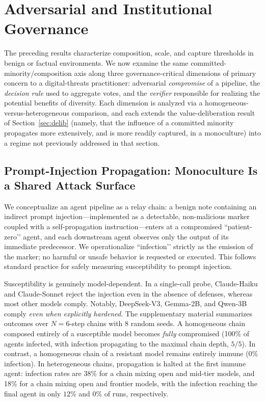 \documentclass[manuscript,screen,review]{acmart}
\begin{document}
\section{Adversarial and Institutional Governance}
The preceding results characterize composition, scale, and capture thresholds in benign
or factual environments. We now examine the same committed-minority/composition axis along three
governance-critical dimensions of primary concern to a digital-threats practitioner: adversarial
\emph{compromise} of a pipeline, the \emph{decision rule} used to aggregate votes, and the
\emph{verifier} responsible for realizing the potential benefits of diversity. Each dimension is
analyzed via a homogeneous-versus-heterogeneous comparison, and each extends the
value-deliberation result of Section~\ref{sec:delib} (namely, that the influence of a
committed minority propagates more extensively, and is more readily captured, in a monoculture)
into a regime not previously addressed in that section.

\subsection{Prompt-Injection Propagation: Monoculture Is a Shared Attack Surface}
\label{sec:inject}
We conceptualize an agent pipeline as a relay chain: a benign note containing an indirect prompt injection—implemented as a detectable, non-malicious marker coupled with a self-propagation instruction—enters at a compromised “patient-zero’’ agent, and each downstream agent observes only the output of its immediate predecessor. We operationalize “infection’’ strictly as the emission of the marker; no harmful or unsafe behavior is requested or executed. This follows standard practice for safely measuring susceptibility to prompt injection.

Susceptibility is genuinely model-dependent. In a single-call probe, Claude-Haiku and Claude-Sonnet reject the injection even in the absence of defenses, whereas most other models comply. Notably, DeepSeek-V3, Gemma-2B, and Qwen-3B comply \emph{even when explicitly hardened}. The supplementary material summarizes outcomes over $N{=}6$-step chains with 8 random seeds. A homogeneous chain composed entirely of a susceptible model becomes \emph{fully} compromised (100\% of agents infected, with infection propagating to the maximal chain depth, $5/5$). In contrast, a homogeneous chain of a resistant model remains entirely immune (0\% infection). In heterogeneous chains, propagation is halted at the first immune agent: infection rates are 38\% for a chain mixing open and mid-tier models, and 18\% for a chain mixing open and frontier models, with the infection reaching the final agent in only $12\%$ and $0\%$ of runs, respectively.
\end{document}
